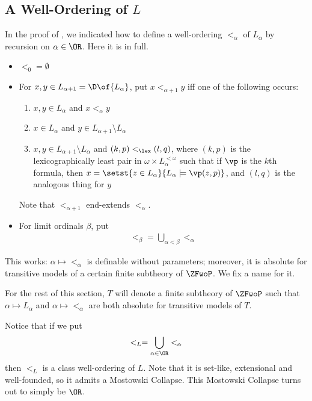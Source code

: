 \subsection{A Well-Ordering of $L$}

In the proof of , we indicated how to define a well-ordering $<_{\alpha}$ of $L_{\alpha}$ by recursion on $\alpha \in \OR$. Here it is in full.
\begin{itemize}
    \item $<_0 = \emptyset$
    \item For $x, y \in L_{\alpha + 1} = \D\of{L_{\alpha}}$, put $x <_{\alpha + 1} y$ iff one of the following occurs:
    \begin{enumerate}
        \item $x, y \in L_{\alpha}$ and $x <_{\alpha} y$
        \item $x \in L_{\alpha}$ and $y \in L_{\alpha + 1} \setminus L_{\alpha}$
        \item $x, y \in L_{\alpha + 1} \setminus L_{\alpha}$ and $(k, p) <_{\lex} (l, q)$, where $(k, p)$ is the lexicographically least pair in $\omega \times L_{\alpha}^{< \omega}$ such that if $\vp$ is the $k$th formula, then $x = \setst{z \in L_{\alpha}}{L_{\alpha} \models \vp(z, p)}$, and $(l, q)$ is the analogous thing for $y$
    \end{enumerate}
    Note that $<_{\alpha + 1}$ end-extends $<_{\alpha}$.

    \item For limit ordinals $\beta$, put
    \begin{align*}
        <_{\beta} = \bigcup_{\alpha < \beta} <_{\alpha}
    \end{align*}
\end{itemize}
This works: $\alpha \mapsto <_{\alpha}$ is definable without parameters; moreover, it is absolute for transitive models of a certain finite subtheory of $\ZFwoP$. We fix a name for it.

\begin{boxnotation}
    For the rest of this section, $T$ will denote a finite subtheory of $\ZFwoP$ such that $\alpha \mapsto L_{\alpha}$ and $\alpha \mapsto <_{\alpha}$ are both absolute for transitive models of $T$.
\end{boxnotation}

Notice that if we put
\begin{align*}
    <_{L} = \bigcup_{\alpha \in \OR} <_{\alpha}
\end{align*}
then $<_L$ is a class well-ordering of $L$. Note that it is set-like, extensional and well-founded, so it admits a Mostowski Collapse. This Mostowski Collapse turns out to simply be $\OR$.

